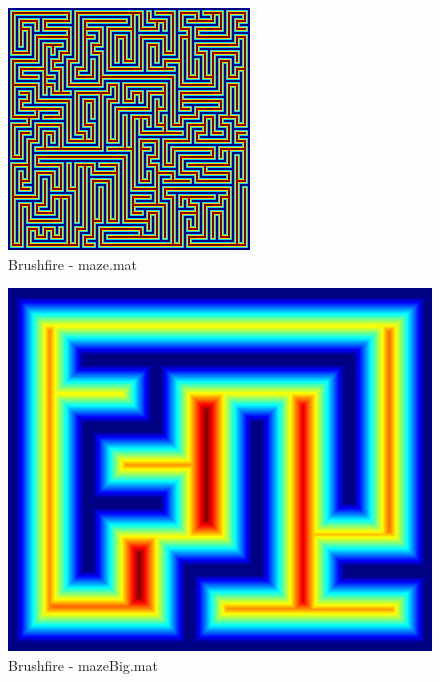 \documentclass[journal]{IEEEtran}
\begin{document}
\begin{figure}\label{maze_bf}
	\centering
	\includegraphics[width=0.8\linewidth]{figures/maze_bf.png}
	\caption{Brushfire - maze.mat}
\end{figure}

\begin{figure}\label{mazeBig_bf}
	\centering
	\includegraphics[width=0.8\linewidth]{figures/mazeBig_bf.png}
	\caption{Brushfire - mazeBig.mat}
\end{figure}
\end{document}
